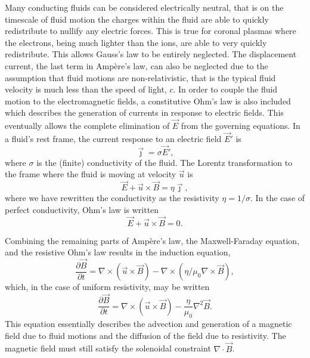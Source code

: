 Many conducting fluids can be considered electrically neutral, that is on the timescale of fluid motion the charges within the fluid are able to quickly redistribute to nullify any electric forces. This is true for coronal plasmas where the electrons, being much lighter than the ions, are able to very quickly redistribute. This allows Gauss's law to be entirely neglected. The displacement current, the last term in Ampère's law, can also be neglected due to the assumption that fluid motions are non-relativistic, that is the typical fluid velocity is much less than the speed of light, $c$. In order to couple the fluid motion to the electromagnetic fields, a constitutive Ohm's law is also included which describes the generation of currents in response to electric fields. This eventually allows the complete elimination of $\vec{E}$ from the governing equations. In a fluid's rest frame, the current response to an electric field $\vec{E}'$ is
\begin{equation}
  \label{eq:rest_frame_ohms_law}
  \vec{\jmath} = \sigma \vec{E}',
\end{equation}
where $\sigma$ is the (finite) conductivity of the fluid. The Lorentz transformation to the frame where the fluid is moving at velocity $\vec{u}$ is
\begin{equation}
  \label{eq:resistive_ohms_law}
  {\vec {E}}+{\vec{u}}\times {\vec {B}}=\eta{\vec {\jmath}},
\end{equation}
where we have rewritten the conductivity as the resistivity $\eta = 1/\sigma$. In the case of perfect conductivity, Ohm's law is written
\begin{equation}
  \label{eq:ideal_ohms_law}
  {\vec {E}}+{\vec{u}}\times {\vec {B}}=0.
\end{equation}

Combining the remaining parts of Ampère's law, the Maxwell-Faraday equation, and the resistive Ohm's law results in the induction equation,
\begin{equation}
  \label{eq:nonsimple_induction_equation}
{\frac {\partial \vec {B} }{\partial t}} = \nabla \times (\vec{u} \times \vec{B}) - \nabla \times (\eta/\mu_0 \nabla \times \vec{B}),
\end{equation}
which, in the case of uniform resistivity, may be written
\begin{equation}
  \label{eq:induction_equation}
{\frac {\partial \vec {B} }{\partial t}} = \nabla \times (\vec{u} \times \vec{B}) - \frac{\eta}{\mu_0}\nabla^2 \vec{B}.
\end{equation}
This equation essentially describes the advection and generation of a magnetic field due to fluid motions and the diffusion of the field due to resistivity. The magnetic field must still satisfy the solenoidal constraint $\nabla \cdot \vec{B}$.

